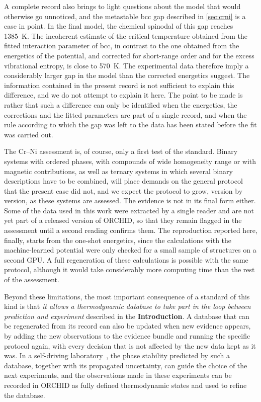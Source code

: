 A complete record also brings to light questions about the model that would otherwise go unnoticed, and the metastable bcc gap described in \cref{sec:crni} is a case in point. In the final model, the chemical spinodal of this gap reaches \qty{1385}{\K}. The incoherent estimate of the critical temperature obtained from the fitted interaction parameter of bcc, in contrast to the one obtained from the energetics of the potential, and corrected for short-range order and for the excess vibrational entropy, is close to \qty{570}{\K}. The experimental data therefore imply a considerably larger gap in the model than the corrected energetics suggest. The information contained in the present record is not sufficient to explain this difference, and we do not attempt to explain it here. The point to be made is rather that such a difference can only be identified when the energetics, the corrections and the fitted parameters are part of a single record, and when the rule according to which the gap was left to the data has been stated before the fit was carried out.

The Cr--Ni assessment is, of course, only a first test of the standard. Binary systems with ordered phases, with compounds of wide homogeneity range or with magnetic contributions, as well as ternary systems in which several binary descriptions have to be combined, will place demands on the general protocol that the present case did not, and we expect the protocol to grow, version by version, as these systems are assessed. The evidence is not in its final form either. Some of the data used in this work were extracted by a single reader and are not yet part of a released version of ORCHID, so that they remain flagged in the assessment until a second reading confirms them. The reproduction reported here, finally, starts from the one-shot energetics, since the calculations with the machine-learned potential were only checked for a small sample of structures on a second GPU. A full regeneration of these calculations is possible with the same protocol, although it would take considerably more computing time than the rest of the assessment.

Beyond these limitations, the most important consequence of a standard of this kind is that \emph{it allows a thermodynamic database to take part in the loop between prediction and experiment} described in the \textbf{Introduction}. A database that can be regenerated from its record can also be updated when new evidence appears, by adding the new observations to the evidence bundle and running the specific protocol again, with every decision that is not affected by the new data kept as it was. In a self-driving laboratory~\cite{abolhasani2023selfdriving,szymanski2023alab}, the phase stability predicted by such a database, together with its propagated uncertainty, can guide the choice of the next experiments, and the observations made in these experiments can be recorded in ORCHID as fully defined thermodynamic states and used to refine the database. 

